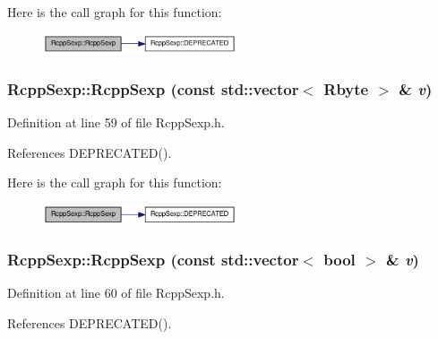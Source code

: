 Here is the call graph for this function:\nopagebreak
\begin{figure}[H]
\begin{center}
\leavevmode
\includegraphics[width=162pt]{classRcppSexp_a72d7ac372a23dcb2d8e7752afc7f07ac_cgraph}
\end{center}
\end{figure}
\hypertarget{classRcppSexp_a1cc2afc964adeae614802949199e4383}{
\subsubsection[{RcppSexp}]{\setlength{\rightskip}{0pt plus 5cm}RcppSexp::RcppSexp (const std::vector$<$ Rbyte $>$ \& {\em v})}}
\label{classRcppSexp_a1cc2afc964adeae614802949199e4383}


Definition at line 59 of file RcppSexp.h.

References DEPRECATED().

Here is the call graph for this function:\nopagebreak
\begin{figure}[H]
\begin{center}
\leavevmode
\includegraphics[width=162pt]{classRcppSexp_a1cc2afc964adeae614802949199e4383_cgraph}
\end{center}
\end{figure}
\hypertarget{classRcppSexp_ad953b65f5ea98d7519b51f1f56c8847a}{
\subsubsection[{RcppSexp}]{\setlength{\rightskip}{0pt plus 5cm}RcppSexp::RcppSexp (const std::vector$<$ bool $>$ \& {\em v})}}
\label{classRcppSexp_ad953b65f5ea98d7519b51f1f56c8847a}


Definition at line 60 of file RcppSexp.h.

References DEPRECATED().

